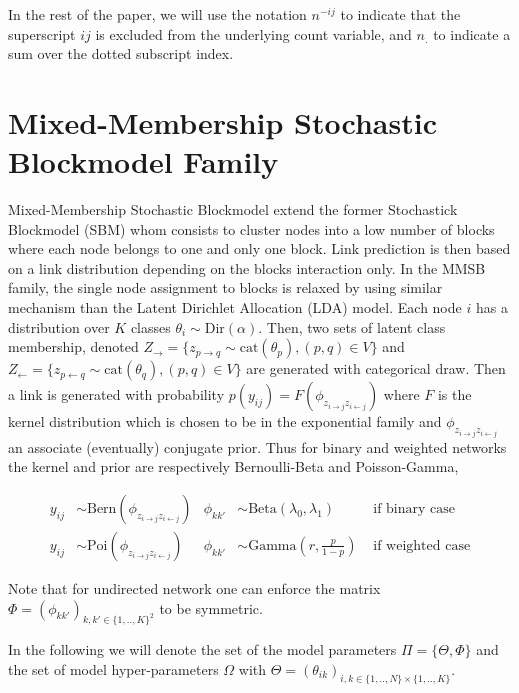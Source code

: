 In the rest of the paper, we will use the notation $n^{-ij}$ to indicate that the superscript $ij$ is excluded from the underlying count variable, and $n_{\bm{.}}$ to indicate a sum over the dotted subscript index.


\section{Mixed-Membership Stochastic Blockmodel Family}

Mixed-Membership Stochastic Blockmodel extend the former Stochastick Blockmodel (SBM) \cite{airoldi2009mixed} whom consists to cluster nodes into a low number of blocks where each node belongs to one and only one block. Link prediction is then based on a link distribution depending on the blocks interaction only. %
In the MMSB family, the single node assignment to blocks is relaxed by using similar mechanism than the Latent Dirichlet Allocation (LDA) model. Each node $i$ has a distribution over $K$ classes $\theta_i \sim \textrm{Dir}(\alpha)$. Then, two sets of latent class membership, denoted $Z_\rightarrow = \{z_{p\rightarrow q} \sim \textrm{cat}(\theta_p),  (p,q) \in V\}$ and $Z_\leftarrow = \{z_{p\leftarrow q} \sim \textrm{cat}(\theta_q),  (p,q) \in V\}$ are generated with categorical draw. Then a link is generated with probability $p(y_{ij}) = F(\phi_{z_{i \rightarrow j}z_{i \leftarrow j}})$ where $F$ is the kernel distribution which is chosen to be in the exponential family and $\phi_{z_{i \rightarrow j}z_{i \leftarrow j}}$ an associate (eventually) conjugate prior. Thus for binary and weighted networks the kernel and prior are respectively Bernoulli-Beta and Poisson-Gamma,

\begin{align*} \label{eq:generative}
y_{ij} &\sim \textrm{Bern}(\phi_{z_{i \rightarrow j}z_{i \leftarrow j}}) & \phi_{kk'} &\sim \textrm{Beta}(\lambda_0, \lambda_1) & \textrm{ if binary case} \\
y_{ij} &\sim \textrm{Poi}(\phi_{z_{i \rightarrow j}z_{i \leftarrow j}}) &  \phi_{kk'} &\sim \textrm{Gamma}(r, \frac{p}{1-p})    & \textrm{ if weighted case} 
\end{align*}

Note that for undirected network one can enforce the matrix $\Phi = (\phi_{kk'})_{k,k' \in \{1,..,K\}^2}$ to be symmetric.

In the following we will denote the set of the model parameters $\Pi = \{ \Theta, \Phi \}$ and the set of model hyper-parameters $\Omega$ with $\Theta = (\theta_{ik})_{i,k \in \{1,..,N\}\times \{1,..,K\}}$.

